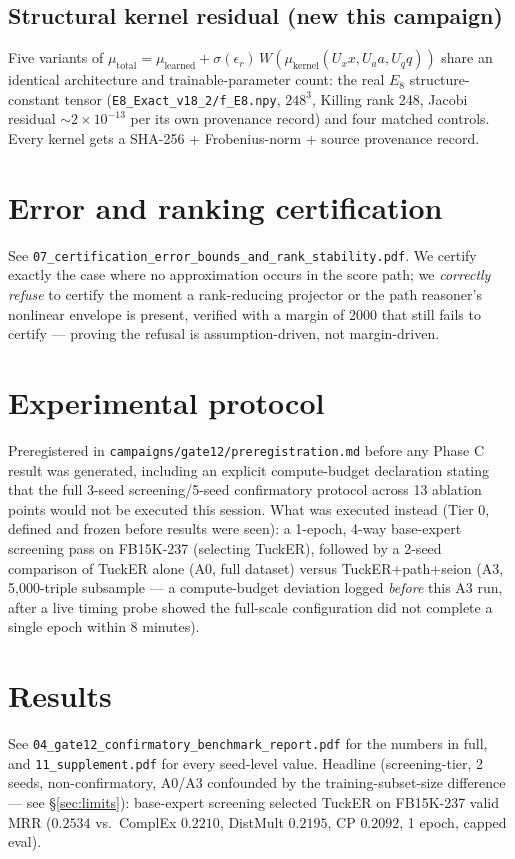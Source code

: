 \documentclass[11pt]{article}
\begin{document}
\subsection{Structural kernel residual (new this campaign)}
Five variants of $\mu_{\text{total}} = \mu_{\text{learned}} + \sigma(\epsilon_r)\,W(\mu_{\text{kernel}}(U_x x,U_a a,U_q q))$
share an identical architecture and trainable-parameter count: the real $E_8$ structure-constant
tensor (\texttt{E8\_Exact\_v18\_2/f\_E8.npy}, $248^3$, Killing rank 248, Jacobi residual
$\sim2\times10^{-13}$ per its own provenance record) and four matched controls. Every kernel gets a
SHA-256 + Frobenius-norm + source provenance record.

\section{Error and ranking certification}
See \texttt{07\_certification\_error\_bounds\_and\_rank\_stability.pdf}. We certify exactly the
case where no approximation occurs in the score path; we \emph{correctly refuse} to certify the
moment a rank-reducing projector or the path reasoner's nonlinear envelope is present, verified
with a margin of 2000 that still fails to certify --- proving the refusal is assumption-driven, not
margin-driven.

\section{Experimental protocol}
Preregistered in \texttt{campaigns/gate12/preregistration.md} before any Phase C result was
generated, including an explicit compute-budget declaration stating that the full 3-seed
screening/5-seed confirmatory protocol across 13 ablation points would not be executed this
session. What was executed instead (Tier 0, defined and frozen before results were seen): a
1-epoch, 4-way base-expert screening pass on FB15K-237 (selecting TuckER), followed by a 2-seed
comparison of TuckER alone (A0, full dataset) versus TuckER+path+seion (A3, 5,000-triple subsample
--- a compute-budget deviation logged \emph{before} this A3 run, after a live timing probe showed
the full-scale configuration did not complete a single epoch within 8 minutes).

\section{Results}
\label{sec:results}
See \texttt{04\_gate12\_confirmatory\_benchmark\_report.pdf} for the numbers in full, and
\texttt{11\_supplement.pdf} for every seed-level value. Headline (screening-tier, 2 seeds,
non-confirmatory, A0/A3 confounded by the training-subset-size difference --- see
\S\ref{sec:limits}): base-expert screening selected TuckER on FB15K-237 valid MRR
($0.2534$ vs.\ ComplEx $0.2210$, DistMult $0.2195$, CP $0.2092$, 1 epoch, capped eval).
\end{document}

